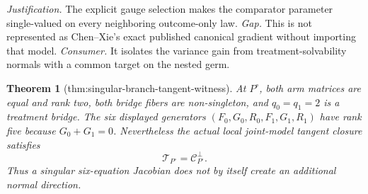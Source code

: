 \documentclass{article}
\newtheorem{theorem}{Theorem}
\begin{document}
\par\smallskip\noindent \textit{Justification.} The explicit gauge selection makes the comparator parameter single-valued on every neighboring outcome-only law. \textit{Gap.} This is not represented as Chen--Xie's exact published canonical gradient without importing that model. \textit{Consumer.} It isolates the variance gain from treatment-solvability normals with a common target on the nested germ.

\begin{theorem}[thm:singular-branch-tangent-witness]\label{thm:singular-branch-tangent-witness}
At \(P^\circ\), both arm matrices are equal and rank two, both bridge fibers are non-singleton, and \(q_0=q_1=2\) is a treatment bridge. The six displayed generators \((F_0,G_0,R_0,F_1,G_1,R_1)\) have rank five because \(G_0+G_1=0\). Nevertheless the actual local joint-model tangent closure satisfies
\[
\mathcal T_{P^\circ}=\mathcal C_{P^\circ}^{\perp}.
\]
Thus a singular six-equation Jacobian does not by itself create an additional normal direction.
\end{theorem}
\end{document}
